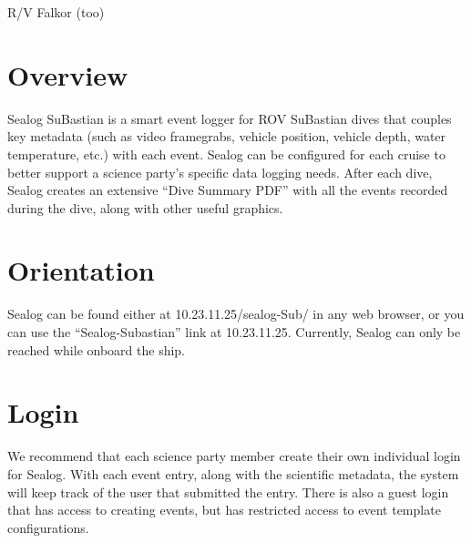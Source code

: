 \documentclass[
  letterpaper,
  DIV=11,
  numbers=noendperiod]{scrreprt}
\begin{document}
R/V Falkor (too)

\hypertarget{overview}{%
\section{Overview}\label{overview}}

Sealog SuBastian is a smart event logger for ROV SuBastian dives that
couples key metadata (such as video framegrabs, vehicle position,
vehicle depth, water temperature, etc.) with each event. Sealog can be
configured for each cruise to better support a science party's specific
data logging needs. After each dive, Sealog creates an extensive ``Dive
Summary PDF'' with all the events recorded during the dive, along with
other useful graphics.

\hypertarget{orientation}{%
\section{Orientation}\label{orientation}}

Sealog can be found either at 10.23.11.25/sealog-Sub/ in any web
browser, or you can use the ``Sealog-Subastian'' link at 10.23.11.25.
Currently, Sealog can only be reached while onboard the ship.

\hypertarget{login}{%
\section{Login}\label{login}}

We recommend that each science party member create their own individual
login for Sealog. With each event entry, along with the scientific
metadata, the system will keep track of the user that submitted the
entry. There is also a guest login that has access to creating events,
but has restricted access to event template configurations.
\end{document}
